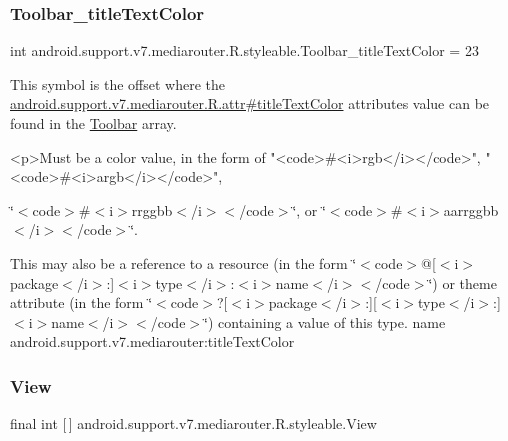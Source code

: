 \subsubsection{\texorpdfstring{Toolbar\+\_\+title\+Text\+Color}{Toolbar\_titleTextColor}}
{\footnotesize\ttfamily int android.\+support.\+v7.\+mediarouter.\+R.\+styleable.\+Toolbar\+\_\+title\+Text\+Color = 23\hspace{0.3cm}{\ttfamily [static]}}

This symbol is the offset where the \hyperlink{classandroid_1_1support_1_1v7_1_1mediarouter_1_1R_1_1attr_ac6dbb1219e8f190a50d809cb15b2c6cf}{android.\+support.\+v7.\+mediarouter.\+R.\+attr\#title\+Text\+Color} attribute\textquotesingle{}s value can be found in the \hyperlink{classandroid_1_1support_1_1v7_1_1mediarouter_1_1R_1_1styleable_a6815cdfaadde30c82b955863af196899}{Toolbar} array.

\begin{DoxyVerb}      <p>Must be a color value, in the form of "<code>#<i>rgb</i></code>", "<code>#<i>argb</i></code>",
\end{DoxyVerb}
 \char`\"{}$<$code$>$\#$<$i$>$rrggbb$<$/i$>$$<$/code$>$\char`\"{}, or \char`\"{}$<$code$>$\#$<$i$>$aarrggbb$<$/i$>$$<$/code$>$\char`\"{}. 

This may also be a reference to a resource (in the form \char`\"{}$<$code$>$@\mbox{[}$<$i$>$package$<$/i$>$\+:\mbox{]}$<$i$>$type$<$/i$>$\+:$<$i$>$name$<$/i$>$$<$/code$>$\char`\"{}) or theme attribute (in the form \char`\"{}$<$code$>$?\mbox{[}$<$i$>$package$<$/i$>$\+:\mbox{]}\mbox{[}$<$i$>$type$<$/i$>$\+:\mbox{]}$<$i$>$name$<$/i$>$$<$/code$>$\char`\"{}) containing a value of this type.  name android.\+support.\+v7.\+mediarouter\+:title\+Text\+Color \mbox{\label{classandroid_1_1support_1_1v7_1_1mediarouter_1_1R_1_1styleable_a69727b595e0fa598a4ad38166ab404a9}} 
\subsubsection{\texorpdfstring{View}{View}}
{\footnotesize\ttfamily final int \mbox{[}$\,$\mbox{]} android.\+support.\+v7.\+mediarouter.\+R.\+styleable.\+View\hspace{0.3cm}{\ttfamily [static]}}

